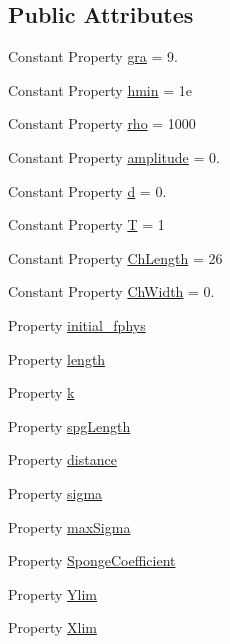 \subsection*{Public Attributes}
\begin{DoxyCompactItemize}
\item 
Constant Property \hyperlink{class_wave_transform_over_an_elliptical_shoal_add2102472125b31f40030e2b825efc78}{gra} = 9.
\item 
Constant Property \hyperlink{class_wave_transform_over_an_elliptical_shoal_acb159d37700d60ae07819191957070f9}{hmin} = 1e
\item 
Constant Property \hyperlink{class_wave_transform_over_an_elliptical_shoal_a40a2da9bb81b641a1bc290026f892e13}{rho} = 1000
\item 
Constant Property \hyperlink{class_wave_transform_over_an_elliptical_shoal_a66baa1e980d24d65a68c1643d61f098c}{amplitude} = 0.
\item 
Constant Property \hyperlink{class_wave_transform_over_an_elliptical_shoal_a101958eba9767cfb0a6b0940b55dc566}{d} = 0.
\item 
Constant Property \hyperlink{class_wave_transform_over_an_elliptical_shoal_ab1f1145dd64a347cc16792e5052afad7}{T} = 1
\item 
Constant Property \hyperlink{class_wave_transform_over_an_elliptical_shoal_a878896c452ee20d7aa472794304bb7d7}{Ch\+Length} = 26
\item 
Constant Property \hyperlink{class_wave_transform_over_an_elliptical_shoal_a39b2cdf800cf23a55c1d6e9573c309b3}{Ch\+Width} = 0.
\item 
Property \hyperlink{class_wave_transform_over_an_elliptical_shoal_ad6aace0f7109e9324d552f9aebc0fd96}{initial\+\_\+fphys}
\item 
Property \hyperlink{class_wave_transform_over_an_elliptical_shoal_a8a730c3befa7141c7800d5409309dcd8}{length}
\item 
Property \hyperlink{class_wave_transform_over_an_elliptical_shoal_a07b82ed23716766025d0793c17a2f8d9}{k}
\item 
Property \hyperlink{class_wave_transform_over_an_elliptical_shoal_aaef8e537f0d1127babde66ec348eb2b2}{spg\+Length}
\item 
Property \hyperlink{class_wave_transform_over_an_elliptical_shoal_ada36113d55cbe64c89b683263df879cf}{distance}
\item 
Property \hyperlink{class_wave_transform_over_an_elliptical_shoal_a5687d1ae03f4e0ee11d1d98ef70c3eb7}{sigma}
\item 
Property \hyperlink{class_wave_transform_over_an_elliptical_shoal_ab121078aee4b59e5cb011279059342ed}{max\+Sigma}
\item 
Property \hyperlink{class_wave_transform_over_an_elliptical_shoal_a1a7dfd9e31c0a40481b639a789450901}{Sponge\+Coefficient}
\item 
Property \hyperlink{class_wave_transform_over_an_elliptical_shoal_a52e30c22358626c897d46541a0331638}{Ylim}
\item 
Property \hyperlink{class_wave_transform_over_an_elliptical_shoal_a57a5d6914aed99b89c0b94bcff6f053c}{Xlim}
\end{DoxyCompactItemize}
